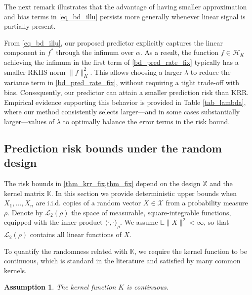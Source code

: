 \documentclass[11pt,twoside]{article}
\newtheorem{assumption}{Assumption}
\def\KK{\mathbb{K}}
\def\XX{\mathbb{X}}
\def\EE{\mathbb{E}}
\def\cH{\mathcal H}
\def\cL{\mathcal L}
\def\cX{\mathcal{X}}
\begin{document}
The next remark illustrates that the advantage of having smaller approximation and bias terms in \eqref{eq_bd_illu} persists more generally whenever linear signal is partially present.

\begin{remark}\label{rem_lambda}
    From \eqref{eq_bd_illu}, our proposed predictor explicitly captures the linear component in $f^*$ through the infimum over $\alpha$. As a result, the function $f \in \cH_K$ achieving the infimum in the first term of \eqref{bd_pred_rate_fix} typically has a smaller RKHS norm $\|f\|_K^2$. This allows choosing a larger $\lambda$ to reduce the variance term in \eqref{bd_pred_rate_fix}, without requiring a tight trade-off with bias. Consequently, our predictor can attain a smaller prediction risk than KRR. Empirical evidence supporting this behavior is provided in Table \ref{tab_lambda}, where our method consistently selects larger—and in some cases substantially larger—values of $\lambda$ to optimally balance the error terms in the risk bound.
\end{remark}

 


\subsection{Prediction risk bounds under the random design}\label{sec_theory_random}

The risk bounds in \cref{thm_krr_fix,thm_fix} depend on the design $\XX$ and the kernel matrix $\KK$. In this section we provide deterministic upper bounds when $X_1,\ldots, X_n$ are i.i.d. copies of a random vector $X\in\cX$ from a probability measure $\rho$. Denote by $\cL_2(\rho)$ the space of measurable, square-integrable functions, equipped with the inner product $\langle \cdot , \cdot \rangle_\rho$. We assume $\EE\|X\|^2 < \infty$, so that $\cL_2(\rho)$ contains all linear functions of $X$. 

To quantify the randomness related with $\KK$, we require the kernel function to be continuous, which is standard in the literature and satisfied by many common kernels.
 \begin{assumption}\label{ass_bd_K}
The kernel function $K$ is continuous. 
\end{assumption}
 
\end{document}
